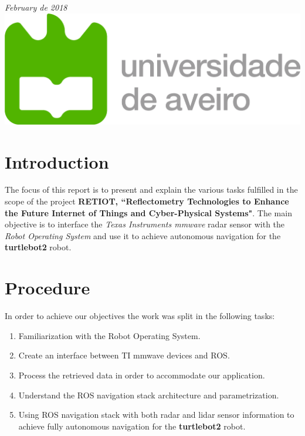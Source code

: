 \documentclass[12pt]{article}
\begin{document}
\begin{titlepage}
{\large \emph{February de 2018}}\\[2cm] %


\includegraphics[scale=0.4]{ua_logo.png} %
 

\vfill %

\end{titlepage}
\tableofcontents
\newpage

\section{Introduction}
The focus of this report is to present and explain the various tasks fulfilled in the scope of the project \textbf{RETIOT, “Reflectometry Technologies to Enhance the Future Internet of Things and Cyber-Physical Systems"}. The main objective is to interface the \textit{Texas Instruments mmwave} radar sensor with the \textit{Robot Operating System} and use it to achieve autonomous navigation for the \textbf{turtlebot2} robot.


\section{Procedure}
In order to achieve our objectives the work was split in the following tasks:
\begin{enumerate}
    \item Familiarization with the Robot Operating System.
    \item Create an interface between TI mmwave devices and ROS.
    \item Process the retrieved data in order to  accommodate our application.
    \item Understand the ROS navigation stack architecture and parametrization.
    \item Using ROS navigation stack with both radar and lidar sensor information to achieve fully autonomous navigation for the \textbf{turtlebot2} robot.
\end{enumerate}
\end{document}
